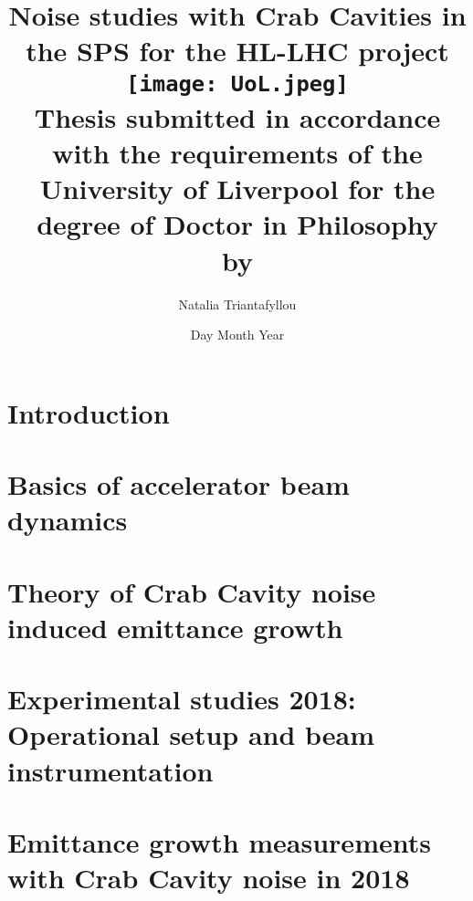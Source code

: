 \documentclass[12pt,twoside]{report} %
\begin{document}
\frontmatter
\title{
{Noise studies with Crab Cavities in the SPS for the HL-LHC project}\\
{\texttt{[image: UoL.jpeg]}} \\
{\large Thesis submitted in accordance with the requirements of the University of Liverpool for the degree of Doctor in Philosophy \\ by}
}
\author{ Natalia Triantafyllou}
\date{Day Month Year}
\maketitle
\newpage




\listoffigures
{}
\listoftables
{}

\newpage

\thispagestyle{plain} %

\listofsymbols
{}

\tableofcontents

\mainmatter

\chapter{Introduction}


\chapter{Basics of accelerator beam dynamics}


\chapter{Theory of Crab Cavity noise induced emittance growth}\label{Ch:CC_noise_theory}


\chapter{Experimental studies 2018: Operational setup and beam instrumentation}


\chapter{Emittance growth measurements with Crab Cavity noise in 2018}

\end{document}
